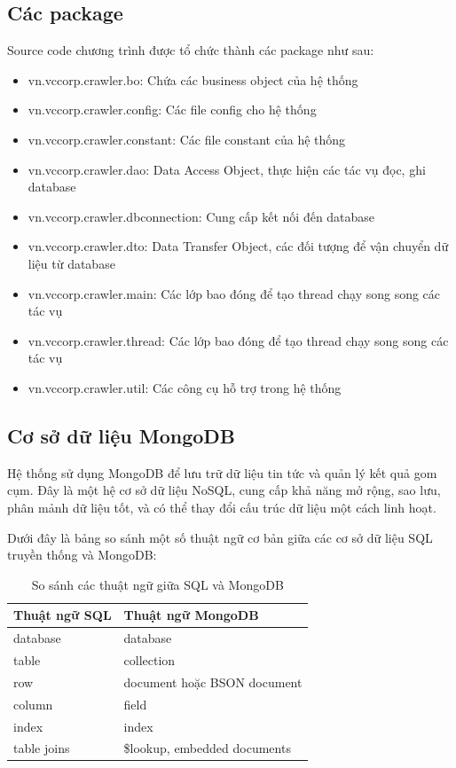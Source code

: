 	\subsection{Các package}
	Source code chương trình được tổ chức thành các package như sau:
	\begin{itemize}
		\item vn.vccorp.crawler.bo: Chứa các business object của hệ thống
		\item vn.vccorp.crawler.config: Các file config cho hệ thống
		\item vn.vccorp.crawler.constant: Các file constant của hệ thống
		\item vn.vccorp.crawler.dao: Data Access Object, thực hiện các tác vụ đọc, ghi database
		\item vn.vccorp.crawler.dbconnection: Cung cấp kết nối đến database
		\item vn.vccorp.crawler.dto: Data Transfer Object, các đối tượng để vận chuyển dữ liệu từ database
		\item vn.vccorp.crawler.main: Các lớp bao đóng để tạo thread chạy song song các tác vụ
		\item vn.vccorp.crawler.thread: Các lớp bao đóng để tạo thread chạy song song các tác vụ
		\item vn.vccorp.crawler.util: Các công cụ hỗ trợ trong hệ thống
	\end{itemize}
	
	\subsection{Cơ sở dữ liệu MongoDB}
	Hệ thống sử dụng MongoDB để lưu trữ dữ liệu tin tức và quản lý kết quả gom cụm. Đây là một hệ cơ sở dữ liệu NoSQL, cung cấp khả năng mở rộng, sao lưu, phân mảnh dữ liệu tốt, và có thể thay đổi cấu trúc dữ liệu một cách linh hoạt.
	
	Dưới đây là bảng so sánh một số thuật ngữ cơ bản giữa các cơ sở dữ liệu SQL truyền thống và MongoDB:
	\begin{table}[H]
		\centering
		\setlength\extrarowheight{3pt}
		\begin{tabular}{|l|l|}
			\hline
			\textbf{Thuật ngữ SQL}	& \textbf{Thuật ngữ MongoDB}  \\\hline
			database	& database \\\hline
			table		& collection \\\hline
			row			& document hoặc BSON document \\\hline
			column		& field \\\hline
			index		& index \\\hline
			table joins	& \$lookup, embedded documents \\\hline
		\end{tabular}
		\caption{So sánh các thuật ngữ giữa SQL và MongoDB}
		\label{tab:table_3_1}
	\end{table}
	
